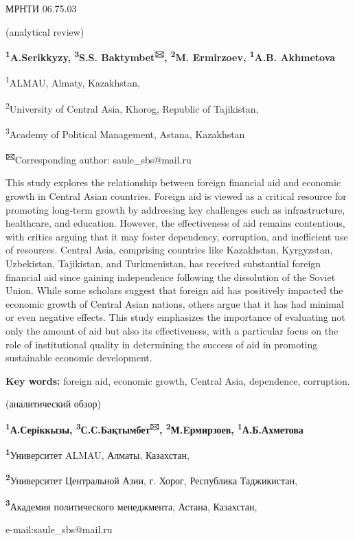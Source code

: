 \newpage
МРНТИ 06.75.03


\begin{center}
(analytical review)

{\bfseries \textsuperscript{1}A.Serikkyzy, \textsuperscript{3}S.S.
Baktymbet\textsuperscript{🖂}, \textsuperscript{2}M. Ermirzoev,
\textsuperscript{1}A.B. Akhmetova}

\textsuperscript{1}ALMAU, Almaty, Kazakhstan,

\textsuperscript{2}University of Central Asia, Khorog, Republic of
Tajikistan,

\textsuperscript{3}Academy of Political Management, Astana, Kazakhstan
\end{center}

{\bfseries \textsuperscript{🖂}}Corresponding author: saule\_sbs@mail.ru

This study explores the relationship between foreign financial aid and
economic growth in Central Asian countries. Foreign aid is viewed as a
critical resource for promoting long-term growth by addressing key
challenges such as infrastructure, healthcare, and education. However,
the effectiveness of aid remains contentious, with critics arguing that
it may foster dependency, corruption, and inefficient use of resources.
Central Asia, comprising countries like Kazakhstan, Kyrgyzstan,
Uzbekistan, Tajikistan, and Turkmenistan, has received substantial
foreign financial aid since gaining independence following the
dissolution of the Soviet Union. While some scholars suggest that
foreign aid has positively impacted the economic growth of Central Asian
nations, others argue that it has had minimal or even negative effects.
This study emphasizes the importance of evaluating not only the amount
of aid but also its effectiveness, with a particular focus on the role
of institutional quality in determining the success of aid in promoting
sustainable economic development.

{\bfseries Key words:} foreign aid, economic growth, Central Asia,
dependence, corruption.


\begin{center}
(аналитический обзор)

{\bfseries \textsuperscript{1}А.Серіккызы,
\textsuperscript{3}С.С.Бақтымбет\textsuperscript{🖂},
\textsuperscript{2}М.Eрмирзоев, \textsuperscript{1}А.Б.Ахметова}

{\bfseries \textsuperscript{1}}Университет ALMAU, Алматы, Казахстан,

{\bfseries \textsuperscript{2}}Университет Центральной Азии, г. Хорог,
Республика Таджикистан,

{\bfseries \textsuperscript{3}}Академия политического менеджмента, Астана,
Казахстан,

e-mail:saule\_sbs@mail.ru
\end{center}

